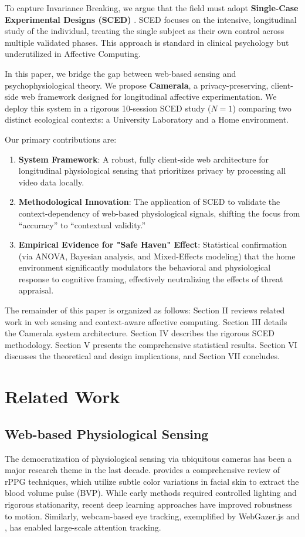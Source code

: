 \documentclass[journal]{IEEEtran}
\begin{document}
To capture Invariance Breaking, we argue that the field must adopt \textbf{Single-Case Experimental Designs (SCED)} \cite{barlow_sced}. SCED focuses on the intensive, longitudinal study of the individual, treating the single subject as their own control across multiple validated phases. This approach is standard in clinical psychology but underutilized in Affective Computing.

In this paper, we bridge the gap between web-based sensing and psychophysiological theory. We propose \textbf{Camerala}, a privacy-preserving, client-side web framework designed for longitudinal affective experimentation. We deploy this system in a rigorous 10-session SCED study ($N=1$) comparing two distinct ecological contexts: a University Laboratory and a Home environment.

Our primary contributions are:
\begin{enumerate}
    \item \textbf{System Framework}: A robust, fully client-side web architecture for longitudinal physiological sensing that prioritizes privacy by processing all video data locally.
    \item \textbf{Methodological Innovation}: The application of SCED to validate the context-dependency of web-based physiological signals, shifting the focus from ``accuracy'' to ``contextual validity.''
    \item \textbf{Empirical Evidence for "Safe Haven" Effect}: Statistical confirmation (via ANOVA, Bayesian analysis, and Mixed-Effects modeling) that the home environment significantly modulators the behavioral and physiological response to cognitive framing, effectively neutralizing the effects of threat appraisal.
\end{enumerate}

The remainder of this paper is organized as follows: Section II reviews related work in web sensing and context-aware affective computing. Section III details the Camerala system architecture. Section IV describes the rigorous SCED methodology. Section V presents the comprehensive statistical results. Section VI discusses the theoretical and design implications, and Section VII concludes.

\section{Related Work}

\subsection{Web-based Physiological Sensing}
The democratization of physiological sensing via ubiquitous cameras has been a major research theme in the last decade. \cite{mcduff_rppg} provides a comprehensive review of rPPG techniques, which utilize subtle color variations in facial skin to extract the blood volume pulse (BVP). While early methods required controlled lighting and rigorous stationarity, recent deep learning approaches have improved robustness to motion. Similarly, webcam-based eye tracking, exemplified by WebGazer.js \cite{webgazer} and \cite{unconstrained_gaze}, has enabled large-scale attention tracking.
\end{document}
